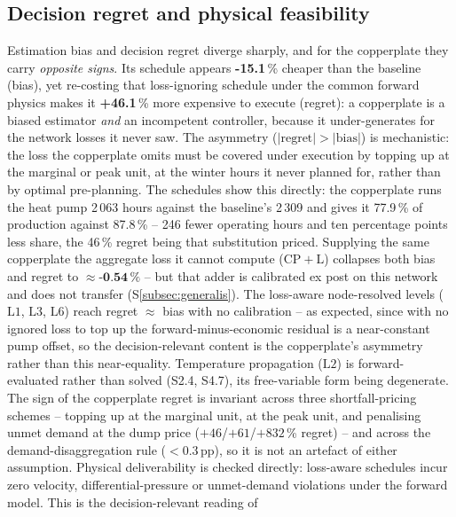 \documentclass[a4paper,fleqn]{cas-dc}
\newcommand{\CPL}{\ensuremath{\mathrm{CP{+}L}}} %
\newcommand{\Lone}{\ensuremath{\mathrm{L1}}}    %
\newcommand{\Ltwo}{\ensuremath{\mathrm{L2}}}    %
\newcommand{\Lthree}{\ensuremath{\mathrm{L3}}}  %
\newcommand{\Lsix}{\ensuremath{\mathrm{L6}}}    %
\begin{document}
\subsection{Decision regret and physical feasibility}
Estimation bias and decision regret diverge sharply, and for the copperplate they
carry \emph{opposite signs}. Its schedule appears \textbf{-15.1}\,\% cheaper
than the baseline (bias), yet re-costing that loss-ignoring schedule under the common
forward physics makes it \textbf{+46.1}\,\% more expensive to execute
(regret): a copperplate is a biased estimator \emph{and} an incompetent controller,
because it under-generates for the network losses it never saw. The asymmetry
($|\text{regret}|>|\text{bias}|$) is mechanistic: the loss the copperplate omits must
be covered under execution by topping up at the marginal or peak unit, at the winter
hours it never planned for, rather than by optimal pre-planning. The schedules show this directly: the copperplate runs the heat pump 2\,063 hours against the baseline's 2\,309 and gives it 77.9\,\% of production against 87.8\,\% -- 246 fewer operating hours and ten percentage points less share, the 46\,\% regret being that substitution priced. Supplying the same
copperplate the aggregate loss it cannot compute (\CPL) collapses both bias and regret
to $\approx\textbf{-0.54}\,\%$ -- but that adder is calibrated ex post on this
network and does not transfer (S\ref{subsec:generalis}). The loss-aware node-resolved levels
(\Lone, \Lthree, \Lsix) reach regret $\approx$ bias with no calibration -- as expected, since with
no ignored loss to top up the forward-minus-economic residual is a near-constant pump offset, so
the decision-relevant content is the copperplate's asymmetry rather than this near-equality.
Temperature propagation (\Ltwo) is forward-evaluated rather than solved (S2.4, S4.7), its
free-variable form being degenerate. The sign of the
copperplate regret is invariant across three shortfall-pricing schemes -- topping up at
the marginal unit, at the peak unit, and penalising unmet demand at the dump price
($+46$/$+61$/$+832$\,\% regret) -- and across the demand-disaggregation rule
($<0.3$\,pp), so it is not an artefact of either assumption. Physical deliverability is
checked directly: loss-aware schedules incur zero velocity, differential-pressure or
unmet-demand violations under the forward model. This is the decision-relevant reading of
\end{document}
